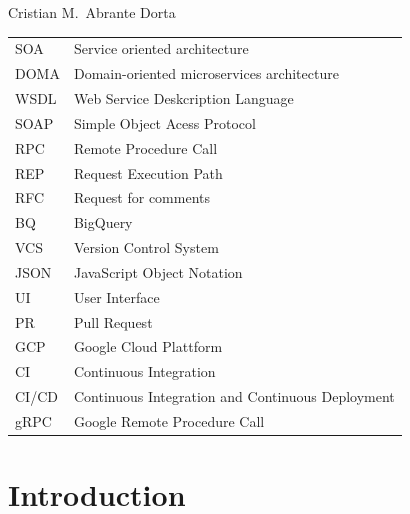 \documentclass[english, 12pt, a4paper, sci, utf8, a-1b, online]{aaltothesis}
\begin{document}
\vspace{5mm}
{\hfill Cristian M.\ Abrante Dorta \hspace{1cm}}

\newpage


\thesistableofcontents



\begin{tabular}{ll}
SOA          & Service oriented architecture \\
DOMA         & Domain-oriented microservices architecture \\
WSDL         & Web Service Deskcription Language \\
SOAP         & Simple Object Acess Protocol \\
RPC          & Remote Procedure Call \\
REP          & Request Execution Path \\
RFC          & Request for comments \\
BQ           & BigQuery \\
VCS          & Version Control System\\
JSON         & JavaScript Object Notation\\
UI           & User Interface\\
PR           & Pull Request\\
GCP          & Google Cloud Plattform\\
CI           & Continuous Integration\\
CI/CD        & Continuous Integration and Continuous Deployment\\
gRPC         & Google Remote Procedure Call\\

\end{tabular}


\cleardoublepage


\section{Introduction}
\end{document}
